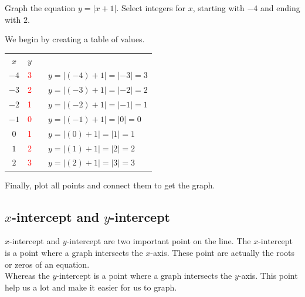 \begin{exa}
    	Graph the equation $y=|x+1|$. Select integers for $x$, starting with $-4$ and ending with $2$.
\end{exa}
We begin by creating a table of values.
\begin{center}
\begin{tabular}{ c | c  cl}
    $x$ & $y$ &\\
    \cline{1-2}
    $-4$	& \textcolor{red}{3}    & &$y=|(-4)+1|=|-3|=3$ \\
    $-3$	& \textcolor{red}{2}    & &$y=|(-3)+1|=|-2|=2$ \\
    $-2$	& \textcolor{red}{1}    & &$y=|(-2)+1|=|-1|=1$ \\
    $-1$	& \textcolor{red}{0}    & &$y=|(-1)+1|=|0|=0$ \\
    $0$	    & \textcolor{red}{1}    & &$y=|(0)+1|=|1|=1$ \\
    $1$	    & \textcolor{red}{2}    & &$y=|(1)+1|=|2|=2$ \\
    $2$	    & \textcolor{red}{3}    & &$y=|(2)+1|=|3|=3$ 
\end{tabular}
\end{center}
Finally, plot all points and connect them to get the graph.
\begin{center}
\end{center}
\subsection{\texorpdfstring{$x$}\ -intercept and \texorpdfstring{$y$}\ -intercept}
$x$-intercept and $y$-intercept are two important point on the line. The $x$-intercept is a point where a graph intersects the $x$-axis. These point are
actually the roots or zeros of an equation.\\
Whereas the $y$-intercept is a point where a graph intersects the $y$-axis. This point help us a lot and make it easier for us to graph.

